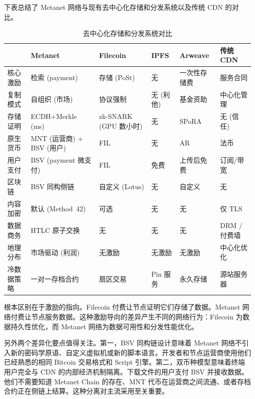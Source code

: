 \documentclass[11pt,a4paper]{article}
\begin{document}
下表总结了 Metanet 网络与现有去中心化存储和分发系统以及传统 CDN 的对比。

\begin{table}[htbp]
\centering
\small
\setlength{\tabcolsep}{4pt}
\begin{tabularx}{\textwidth}{@{}l >{\raggedright\arraybackslash}X >{\raggedright\arraybackslash}X >{\raggedright\arraybackslash}X >{\raggedright\arraybackslash}X >{\raggedright\arraybackslash}X@{}}
\toprule
 & \textbf{Metanet} & \textbf{Filecoin} & \textbf{IPFS} & \textbf{Arweave} & \textbf{传统 CDN} \\
\midrule
核心激励 & 检索 (payment) & 存储 (PoSt) & 无 & 一次性存储费 & 服务合同 \\
\addlinespace
复制模式 & 自组织 (市场) & 协议强制 & 无 (利他) & 基金资助 & 中心化管理 \\
\addlinespace
存储证明 & ECDH+Merkle (ms) & zk-SNARK (GPU 数小时) & 无 & SPoRA & 无 (信任) \\
\addlinespace
原生货币 & MNT (运营商) + BSV (用户) & FIL & 无 & AR & 法币 \\
\addlinespace
用户支付 & BSV (payment 微支付) & FIL & 免费 & 上传后免费 & 订阅/带宽 \\
\addlinespace
区块链 & BSV 同构侧链 & 自定义 (Lotus) & 无 & 自定义 & 无 \\
\addlinespace
内容加密 & 默认 (Method~42) & 可选 & 无 & 无 & 仅 TLS \\
\addlinespace
数据商务 & HTLC 原子交换 & 无 & 无 & 无 & DRM / 付费墙 \\
\addlinespace
地理分布 & 市场驱动 (利润) & 无激励 & 无激励 & 无激励 & 中心化优化 \\
\addlinespace
冷数据策略 & 一对一存档合约 & 扇区交易 & Pin 服务 & 永久存储 & 源站服务器 \\
\bottomrule
\end{tabularx}
\caption{去中心化存储和分发系统对比}
\end{table}

根本区别在于激励的指向。Filecoin 付费让节点证明它们存储了数据。Metanet 网络付费让节点服务数据。这种激励导向的差异产生不同的网络行为：Filecoin 为数据持久性优化，而 Metanet 网络为数据可用性和分发性能优化。

另外两个差异化要点值得关注。第一，BSV 同构链设计意味着 Metanet 网络不引入新的密码学原语、自定义虚拟机或新的脚本语言。开发者和节点运营商使用他们已经熟悉的相同 Bitcoin 交易格式和 Script 引擎。第二，双币种模型意味着终端用户完全与 CDN 的内部经济机制隔离。下载文件的用户支付 BSV 并接收数据。他们不需要知道 Metanet Chain 的存在、MNT 代币在运营商之间流通、或者存档合约正在侧链上结算。这种分离对主流采用至关重要。
\end{document}
